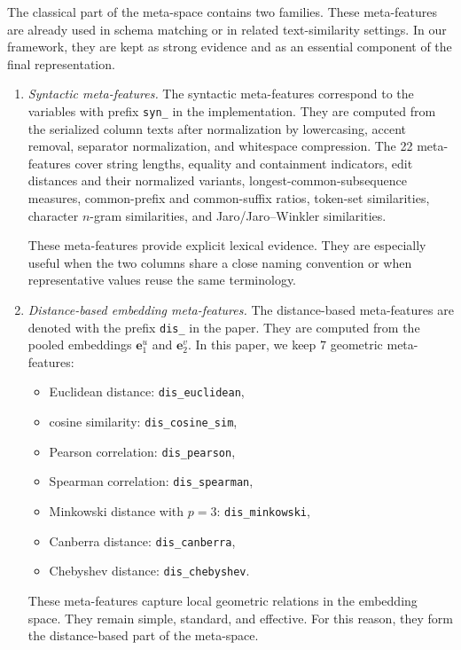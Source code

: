 \documentclass[sigconf, nonacm]{acmart}
\begin{document}
The classical part of the meta-space contains two families. These meta-features are already used in schema matching or in related text-similarity settings. In our framework, they are kept as strong evidence and as an essential component of the final representation.
\begin{enumerate}
    \item  \textit{Syntactic meta-features.}
The syntactic meta-features correspond to the variables with prefix \texttt{syn\_} in the implementation. They are computed from the serialized column texts after normalization by lowercasing, accent removal, separator normalization, and whitespace compression. The 22 meta-features cover string lengths, equality and containment indicators, edit distances and their normalized variants, longest-common-subsequence measures, common-prefix and common-suffix ratios, token-set similarities, character \(n\)-gram similarities, and Jaro/Jaro--Winkler similarities.

These meta-features provide explicit lexical evidence. They are especially useful when the two columns share a close naming convention or when representative values reuse the same terminology.

\item \textit{Distance-based embedding meta-features.}
The distance-based meta-features are denoted with the prefix \texttt{dis\_} in the paper. They are computed from the pooled embeddings \(\mathbf{e}_1^u\) and \(\mathbf{e}_2^v\). In this paper, we keep \(7\) geometric meta-features:
\begin{itemize}[leftmargin=*]
    \item Euclidean distance: \texttt{dis\_euclidean},
    \item cosine similarity: \texttt{dis\_cosine\_sim},
    \item Pearson correlation: \texttt{dis\_pearson},
    \item Spearman correlation: \texttt{dis\_spearman},
    \item Minkowski distance with \(p=3\): \texttt{dis\_minkowski},
    \item Canberra distance: \texttt{dis\_canberra},
    \item Chebyshev distance: \texttt{dis\_chebyshev}.
\end{itemize}

These meta-features capture local geometric relations in the embedding space. They remain simple, standard, and effective. For this reason, they form the distance-based part of the meta-space.
\end{enumerate}
\end{document}
